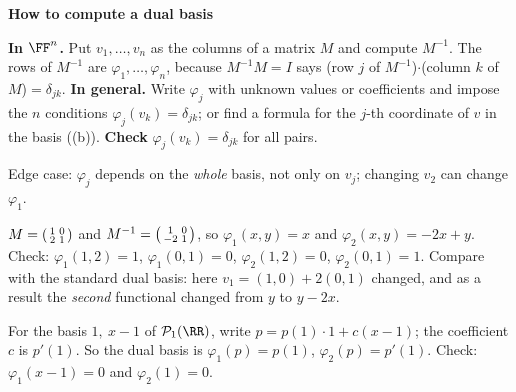 \documentclass[10pt]{scrartcl}
\newcommand{\PP}{\mathcal P}\newcommand{\LL}{\mathcal L}\newcommand{\MM}{\mathcal M}\newcommand{\T}{\mathsf T}
\newenvironment{methodbox}[1]{\begin{mdframed}[style=methodstyle]\textbf{\color{NavyBlue}#1}\par\vspace{2pt}}{\end{mdframed}}
\begin{document}
\begin{methodbox}{How to compute a dual basis}
  \begin{steps}
    \ii \textbf{In $\FF^n$.} Put $v_1,\dots,v_n$ as the columns of a matrix $M$ and compute $M^{-1}$. The rows of $M^{-1}$ are $\varphi_1,\dots,\varphi_n$, because $M^{-1}M=I$ says (row $j$ of $M^{-1}$)$\cdot$(column $k$ of $M$)$=\delta_{jk}$.
    \ii \textbf{In general.} Write $\varphi_j$ with unknown values or coefficients and impose the $n$ conditions $\varphi_j(v_k)=\delta_{jk}$; or find a formula for the $j$-th coordinate of $v$ in the basis ((b)).
    \ii \textbf{Check} $\varphi_j(v_k)=\delta_{jk}$ for all pairs.
  \end{steps}
  Edge case: $\varphi_j$ depends on the \emph{whole} basis, not only on $v_j$; changing $v_2$ can change $\varphi_1$.
\end{methodbox}

\begin{example*}
  $M=\begin{psmallmatrix}1&0\\2&1\end{psmallmatrix}$ and $M^{-1}=\begin{psmallmatrix}1&0\\-2&1\end{psmallmatrix}$, so $\varphi_1(x,y)=x$ and $\varphi_2(x,y)=-2x+y$. Check: $\varphi_1(1,2)=1$, $\varphi_1(0,1)=0$, $\varphi_2(1,2)=0$, $\varphi_2(0,1)=1$. Compare with the standard dual basis: here $v_1=(1,0)+2(0,1)$ changed, and as a result the \emph{second} functional changed from $y$ to $y-2x$.
\end{example*}

\begin{example*}
  For the basis $1,\ x-1$ of $\PP_1(\RR)$, write $p=p(1)\cdot1+c(x-1)$; the coefficient $c$ is $p'(1)$. So the dual basis is $\varphi_1(p)=p(1)$, $\varphi_2(p)=p'(1)$. Check: $\varphi_1(x-1)=0$ and $\varphi_2(1)=0$.
\end{example*}
\end{document}
